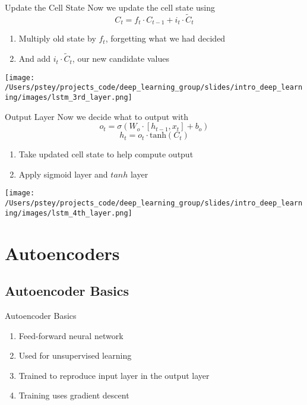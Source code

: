 \documentclass[pdf]{beamer}
\begin{document}
	
	\begin{frame}{Update the Cell State}
	Now we update the cell state using
	\[
	C_t = f_t \cdot C_{t-1} + i_t \cdot \widetilde{C}_t
	\]
	\begin{enumerate}

		\item Multiply old state by $f_t$, forgetting what we had decided 
		\item And add $i_t \cdot \widetilde{C}_t$, our new candidate values
	\end{enumerate}
	\begin{center}
		\texttt{[image: /Users/pstey/projects\_code/deep\_learning\_group/slides/intro\_deep\_learning/images/lstm\_3rd\_layer.png]}
	\end{center}
	\end{frame}
	



	\begin{frame}{Output Layer}
	Now we decide what to output with
	\[
	o_t = \sigma(W_o \cdot [h_{t-1}, x_t] + b_o) 
	\]
	\[
	h_t = o_t \cdot \text{tanh}(C_t)
	\]
	\begin{enumerate}

		\item Take updated cell state to help compute output 
		\item Apply sigmoid layer and $tanh$ layer
	\end{enumerate}
	\begin{center}
		\texttt{[image: /Users/pstey/projects\_code/deep\_learning\_group/slides/intro\_deep\_learning/images/lstm\_4th\_layer.png]}
	\end{center}
	\end{frame}
	




\section{Autoencoders}

\subsection{Autoencoder Basics}
		\begin{frame}{Autoencoder Basics}
		\begin{enumerate}
			
			\item Feed-forward neural network
			\item Used for unsupervised learning 
			\item Trained to reproduce input layer in the output layer
			\item Training uses gradient descent
		\end{enumerate}
		\end{frame}
		
\end{document}
